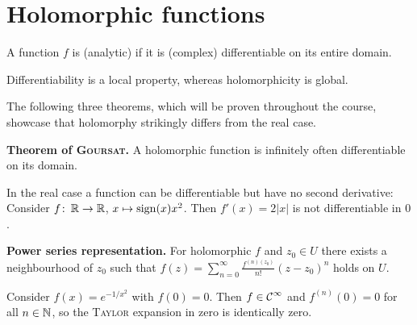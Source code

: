 \documentclass[a4paper,english]{article}
\begin{document}
\section{Holomorphic functions}

\begin{defn}[holomorphic]
    A function $f$ is  (analytic) if it is (complex) differentiable on its entire domain.
\end{defn}

Differentiability is a local property, whereas holomorphicity is global.

The following three theorems, which will be proven throughout the course, showcase that holomorphy strikingly differs from the real case.

\textbf{Theorem of \textsc{Goursat}.}
A holomorphic function is infinitely often differentiable on its domain.

\begin{cexample}
In the real case a function can be differentiable but have no second derivative:
Consider $f \colon \operatorname{\mathbb{R}} \to \operatorname{\mathbb{R}}$, $x \mapsto \operatorname{sign}(x) x^2$.
Then $f'(x) = 2 | x |$ is not differentiable in $0$.
\end{cexample}

\textbf{Power series representation.}
For holomorphic $f$ and $z_0 \in U$ there exists a neighbourhood of $z_0$ such that $f(z) = \sum_{n = 0}^{\infty} \frac{f^{(n)(z_0)}}{n!} (z - z_0)^n$ holds on $U$.

\begin{marginfigure}
    \caption{The function $f(x) = \exp\left(- \frac{1}{x^2}\right)$.}
\end{marginfigure}
\begin{cexampleB}
    Consider $f(x) = e^{-1/x^2}$ with $f(0) = 0$.
    Then $f \in \operatorname{\mathcal{C}}^{\infty}$ and $f^{(n)}(0) = 0$ for all $n \in \operatorname{\mathbb{N}}$, so the \textsc{Taylor} expansion in zero is identically zero.
\end{cexampleB}
\end{document}
